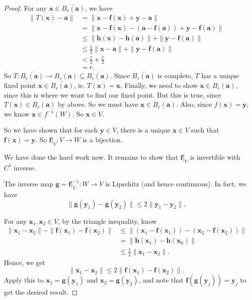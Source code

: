 \documentclass[a4paper]{article}
\begin{document}
\begin{proof}
  For any $\mathbf{x}\in \overline{B_r(\mathbf{a})}$, we have
  \begin{align*}
    \|T(\mathbf{x}) - \mathbf{a}\| &= \|\mathbf{x} - \mathbf{f}(\mathbf{x}) + \mathbf{y} - \mathbf{a}\|\\
    &= \|\mathbf{x} - \mathbf{f}(\mathbf{x}) - (\mathbf{a} - \mathbf{f}(\mathbf{a})) + \mathbf{y} - \mathbf{f}(\mathbf{a})\|\\
    &\leq \|\mathbf{h}(\mathbf{x}) - \mathbf{h}(\mathbf{a})\| + \|\mathbf{y} - \mathbf{f}(\mathbf{a})\|\\
    &\leq \frac{1}{2} \|\mathbf{x} - \mathbf{a}\| + \|\mathbf{y} - \mathbf{f}(\mathbf{a})\|\\
    &< \frac{r}{2} + \frac{r}{2}\\
    &= r.
  \end{align*}
  So $T: \overline{B_r(\mathbf{a})} \to B_r(\mathbf{a}) \subseteq \overline{B_r(\mathbf{a})}$. Since $\overline{B_r(\mathbf{a})}$ is complete, $T$ has a unique fixed point $\mathbf{x} \in \overline{B_r(\mathbf{a})}$, ie. $T(\mathbf{x}) = \mathbf{x}$. Finally, we need to show $\mathbf{x} \in B_r(\mathbf{a})$, since this is where we want to find our fixed point. But this is true, since $T(\mathbf{x}) \in B_r(\mathbf{a})$ by above. So we must have $\mathbf{x} \in B_r(\mathbf{a})$. Also, since $f(\mathbf{x}) = \mathbf{y}$, we know $\mathbf{x} \in f^{-1}(W)$. So $\mathbf{x} \in V$.

  So we have shown that for each $\mathbf{y} \in V$, there is a unique $\mathbf{x} \in V$ such that $\mathbf{f}(\mathbf{x}) = \mathbf{y}$. So $\mathbf{f}|_V: V \to W$ is a bijection.

  We have done the hard work now. It remains to show that $\mathbf{f}|_V$ is invertible with $C^1$ inverse.

  \begin{claim}
    The inverse map $\mathbf{g} = \mathbf{f}|_V^{-1}: W \to V$ is Lipschitz (and hence continuous). In fact, we have
    \[
      \|\mathbf{g}(\mathbf{y}_1) - \mathbf{g}(\mathbf{y}_2)\| \leq 2 \|\mathbf{y}_1 - \mathbf{y}_2\|.
    \]
  \end{claim}

  For any $\mathbf{x}_1, \mathbf{x}_2 \in V$, by the triangle inequality, know
  \begin{align*}
    \|\mathbf{x}_1 - \mathbf{x}_2\| - \|\mathbf{f}(\mathbf{x}_1) - \mathbf{f}(\mathbf{x}_2)\| &\leq \|(\mathbf{x}_1 - \mathbf{f}(\mathbf{x}_1)) - (\mathbf{x}_2 - \mathbf{f}(\mathbf{x}_2))\|\\
    &= \|\mathbf{h}(\mathbf{x}_1) - \mathbf{h}(\mathbf{x}_0)\|\\
    &\leq \frac{1}{2}\|\mathbf{x}_1 - \mathbf{x}_2\|.
  \end{align*}
  Hence, we get
  \[
    \|\mathbf{x}_1 - \mathbf{x}_2\| \leq 2 \|\mathbf{f}(\mathbf{x}_1) - \mathbf{f}(\mathbf{x}_2)\|.
  \]
  Apply this to $\mathbf{x}_1 = \mathbf{g}(\mathbf{y}_1)$ and $\mathbf{x}_2 = \mathbf{g}(\mathbf{y}_2)$, and note that $\mathbf{f}(\mathbf{g}(\mathbf{y}_j)) = \mathbf{y}_j$ to get the desired result.


\end{proof}
\end{document}
